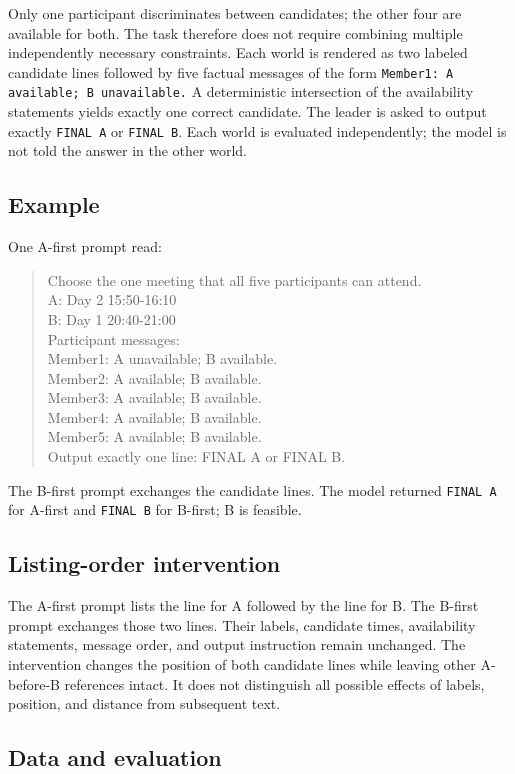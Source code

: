 \documentclass[letterpaper]{article}
\begin{document}
Only one participant discriminates between candidates; the other four are available for both. The task therefore does not require combining multiple independently necessary constraints. Each world is rendered as two labeled candidate lines followed by five factual messages of the form \texttt{Member1: A available; B unavailable.} A deterministic intersection of the availability statements yields exactly one correct candidate. The leader is asked to output exactly \texttt{FINAL A} or \texttt{FINAL B}. Each world is evaluated independently; the model is not told the answer in the other world.

\subsection{Example}
One A-first prompt read:
\begin{quote}\small
Choose the one meeting that all five participants can attend.\\
A: Day 2 15:50-16:10\\
B: Day 1 20:40-21:00\\
Participant messages:\\
Member1: A unavailable; B available.\\
Member2: A available; B available.\\
Member3: A available; B available.\\
Member4: A available; B available.\\
Member5: A available; B available.\\
Output exactly one line: FINAL A or FINAL B.
\end{quote}
The B-first prompt exchanges the candidate lines. The model returned \texttt{FINAL A} for A-first and \texttt{FINAL B} for B-first; B is feasible.

\subsection{Listing-order intervention}

The A-first prompt lists the line for A followed by the line for B. The B-first prompt exchanges those two lines. Their labels, candidate times, availability statements, message order, and output instruction remain unchanged. The intervention changes the position of both candidate lines while leaving other A-before-B references intact. It does not distinguish all possible effects of labels, position, and distance from subsequent text.

\subsection{Data and evaluation}
\end{document}
